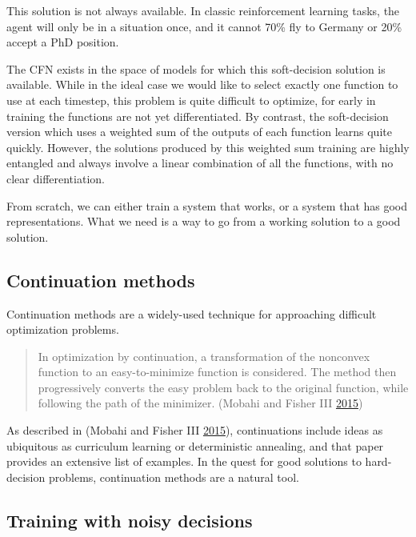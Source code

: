 \documentclass[12pt,twoside]{mitthesis}
\begin{document}
This solution is not always available. In classic reinforcement learning
tasks, the agent will only be in a situation once, and it cannot 70\%
fly to Germany or 20\% accept a PhD position.

The CFN exists in the space of models for which this soft-decision
solution is available. While in the ideal case we would like to select
exactly one function to use at each timestep, this problem is quite
difficult to optimize, for early in training the functions are not yet
differentiated. By contrast, the soft-decision version which uses a
weighted sum of the outputs of each function learns quite quickly.
However, the solutions produced by this weighted sum training are highly
entangled and always involve a linear combination of all the functions,
with no clear differentiation.

From scratch, we can either train a system that works, or a system that
has good representations. What we need is a way to go from a working
solution to a good solution.

\subsection{Continuation methods}\label{continuation-methods}

Continuation methods are a widely-used technique for approaching
difficult optimization problems.

\begin{quote}
In optimization by continuation, a transformation of the nonconvex
function to an easy-to-minimize function is considered. The method then
progressively converts the easy problem back to the original function,
while following the path of the minimizer. (Mobahi and Fisher III
\protect\hyperlink{ref-mobahi2015theoretical}{2015})
\end{quote}

As described in (Mobahi and Fisher III
\protect\hyperlink{ref-mobahi2015theoretical}{2015}), continuations
include ideas as ubiquitous as curriculum learning or deterministic
annealing, and that paper provides an extensive list of examples. In the
quest for good solutions to hard-decision problems, continuation methods
are a natural tool.

\subsection{Training with noisy
decisions}\label{training-with-noisy-decisions}
\end{document}
